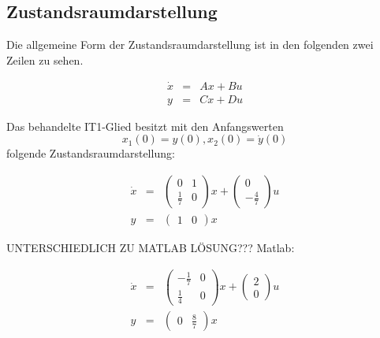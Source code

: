 \subsection{Zustandsraumdarstellung}

Die allgemeine Form der Zustandsraumdarstellung ist in den folgenden zwei Zeilen zu sehen.

\begin{eqnarray*}
	\dot x &=& Ax + Bu \\
	y &=& Cx + Du
\end{eqnarray*}

Das behandelte IT1-Glied besitzt mit den Anfangswerten \[x_1(0) = y(0),  x_2(0) = \dot y(0)\] folgende Zustandsraumdarstellung:

\begin{eqnarray*}
	\dot x &=& \left(\begin{array}{cc} 0 & 1\\ \frac{1}{7} & 0\end{array}\right) x + \left(\begin{array}{c} 0\\ -\frac{4}{7}\end{array}\right) u \\
	y &=& \left(\begin{array}{cc} 1 & 0\end{array}\right) x
\end{eqnarray*} 




UNTERSCHIEDLICH ZU MATLAB LÖSUNG???
Matlab:

\begin{eqnarray*}
	\dot x &=& \left(\begin{array}{cc} -\frac{1}{7} & 0\\ \frac{1}{4} & 0\end{array}\right) x + \left(\begin{array}{c} 2\\ 0\end{array}\right) u  \\
	y &=& \left(\begin{array}{cc} 0 & \frac{8}{7}\end{array}\right) x
\end{eqnarray*}